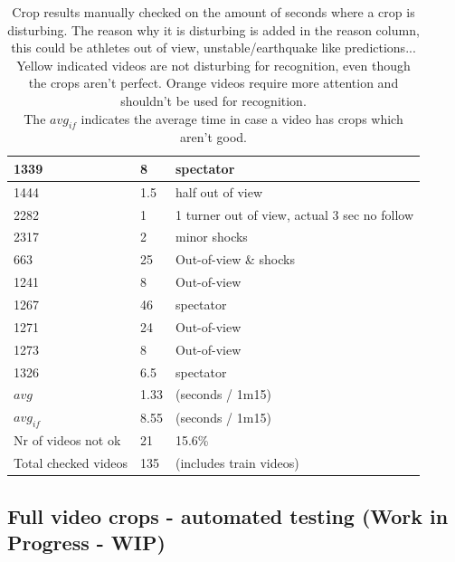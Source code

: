 \begin{table}[h!]
\begin{tabular}{|l|l|l|}
        1339 &	\cellcolor{yellow!25} 8    &  spectator \\ \hline
        1444 &	\cellcolor{yellow!25} 1.5  &	half out of view \\ \hline
        2282 &	\cellcolor{yellow!25} 1    &	1 turner out of view, actual 3 sec no follow \\ \hline
        2317 &	\cellcolor{yellow!25} 2    &	minor shocks \\ \hline
        663  &	\cellcolor{orange!25} 25   &	Out-of-view \& shocks \\ \hline
        1241 &	\cellcolor{orange!25} 8    &	Out-of-view \\ \hline
        1267 &	\cellcolor{orange!25} 46   &	spectator \\ \hline
        1271 &	\cellcolor{orange!25} 24   &	Out-of-view \\ \hline
        1273 &	\cellcolor{orange!25} 8    &	Out-of-view \\ \hline
        1326 &	\cellcolor{orange!25} 6.5  &	spectator \\ \hline
        \(avg\) &	1.33 &	(seconds / 1m15) \\ \hline
        \(avg_{if}\) &	8.55 &	(seconds / 1m15) \\ \hline
        Nr of videos not ok &	21	& 15.6\% \\ \hline
        Total checked videos &	135	& (includes train videos) \\ \hline
    \end{tabular}
    \caption[Manually checked crop results]{Crop results manually checked on the amount of seconds where a crop is disturbing. The reason why it is disturbing is added in the reason column, this could be athletes out of view, unstable/earthquake like predictions... \\
    Yellow indicated videos are not disturbing for recognition, even though the crops aren't perfect. Orange videos require more attention and shouldn't be used for recognition. \\
    The \(avg_{if}\) indicates the average time in case a video has crops which aren't good.}
    \label{tbl:crop-results}
\end{table}


\subsection{Full video crops - automated testing (Work in Progress - WIP)}


